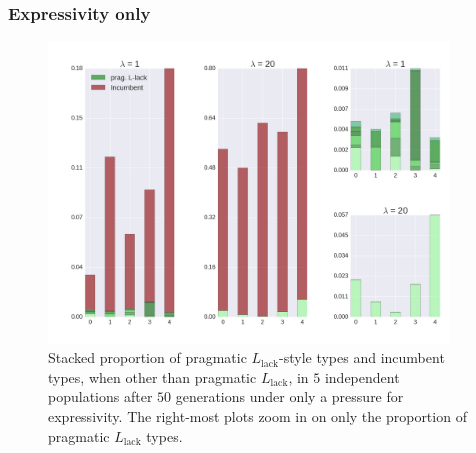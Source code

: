 \documentclass[a4paper]{article}
\newcommand{\mylang}[1]{\ensuremath{L_{\text{#1}}}\xspace} %
\newcommand{\Llack}{\mylang{lack}}
\begin{document}

\subsubsection{Expressivity only} 

\begin{figure}
\centering
\includegraphics[width=\textwidth,height=8cm, keepaspectratio]{./plots/fig1-onlyr}
\caption{Stacked proportion of pragmatic $\Llack$-style types and incumbent types, when other than pragmatic $\Llack$, in $5$ independent populations after $50$ generations under only a pressure for expressivity. The right-most plots zoom in on only the proportion of pragmatic $\Llack$ types.}
\label{fig:only-R}
\end{figure}
\end{document}
